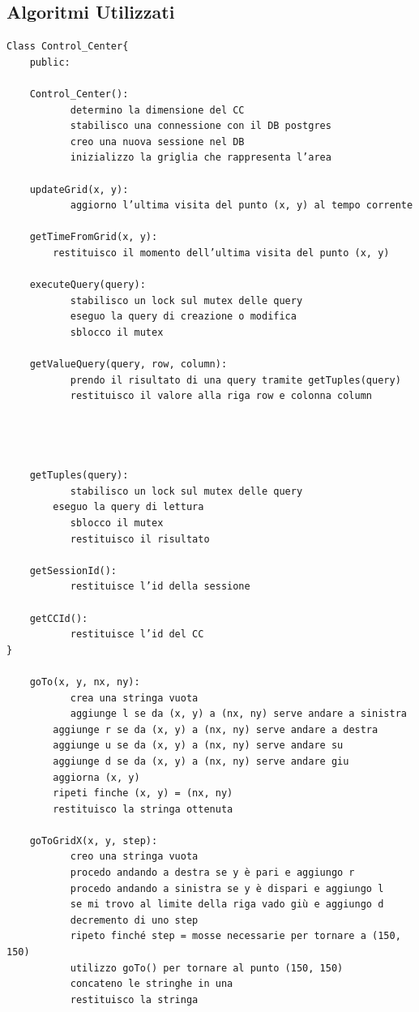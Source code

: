 \documentclass{article}
\begin{document}
\subsection{Algoritmi Utilizzati}
\vspace{5pt}
\raggedright\par{\large{
		\begin{verbatim}
Class Control_Center{
    public:
    
    Control_Center():
	       determino la dimensione del CC
	       stabilisco una connessione con il DB postgres
	       creo una nuova sessione nel DB
	       inizializzo la griglia che rappresenta l’area
	
    updateGrid(x, y):
	       aggiorno l’ultima visita del punto (x, y) al tempo corrente

    getTimeFromGrid(x, y):
        restituisco il momento dell’ultima visita del punto (x, y) 

    executeQuery(query):
	       stabilisco un lock sul mutex delle query
	       eseguo la query di creazione o modifica
	       sblocco il mutex

    getValueQuery(query, row, column):
	       prendo il risultato di una query tramite getTuples(query)
	       restituisco il valore alla riga row e colonna column




    getTuples(query):
	       stabilisco un lock sul mutex delle query
        eseguo la query di lettura
	       sblocco il mutex
	       restituisco il risultato

    getSessionId():
	       restituisce l’id della sessione

    getCCId():
	       restituisce l’id del CC
}

    goTo(x, y, nx, ny):
	       crea una stringa vuota
	       aggiunge l se da (x, y) a (nx, ny) serve andare a sinistra
        aggiunge r se da (x, y) a (nx, ny) serve andare a destra
        aggiunge u se da (x, y) a (nx, ny) serve andare su
        aggiunge d se da (x, y) a (nx, ny) serve andare giu
        aggiorna (x, y)
        ripeti finche (x, y) = (nx, ny)
        restituisco la stringa ottenuta

    goToGridX(x, y, step):
	       creo una stringa vuota
	       procedo andando a destra se y è pari e aggiungo r
	       procedo andando a sinistra se y è dispari e aggiungo l
	       se mi trovo al limite della riga vado giù e aggiungo d
	       decremento di uno step
	       ripeto finché step = mosse necessarie per tornare a (150, 150)
	       utilizzo goTo() per tornare al punto (150, 150)
	       concateno le stringhe in una
	       restituisco la stringa


\end{verbatim}}}
\end{document}
